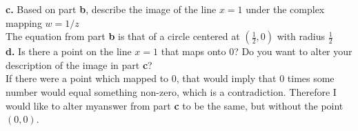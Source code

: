 \documentclass{scrartcl}
\begin{document}
\textbf{c.} Based on part \textbf{b}, describe the image of the line $x=1$ under the complex mapping $w=1/z$\\

The equation from part \textbf{b} is that of a circle centered at $(\frac{1}{2},0)$ with radius $\frac{1}{2}$\\

\textbf{d.} Is there a point on the line $x=1$ that maps onto 0? Do you want to alter your description of the image in part \textbf{c}?\\

If there were a point which mapped to 0, that would imply that 0 times some number would equal something non-zero, which is a contradiction. Therefore I would like to alter myanswer from part \textbf{c} to be the same, but without the point $(0,0)$. 
\end{document}
